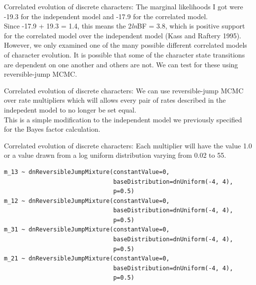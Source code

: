 \documentclass[mathserif]{beamer}
\begin{document}
\begin{frame}[fragile]
    \begin{block}{Correlated evolution of discrete characters:}
    \bigskip
The marginal likelihoods I got were -19.3 for the independent model
and -17.9 for the correlated model.\\
    \bigskip
        Since -17.9 + 19.3 = 1.4, this means the 2\textit{ln}BF = 3.8, which is positive support for
        the correlated model over the independent model (Kass and Raftery 1995).\\
    \bigskip
        However, we only examined one of the many possible different correlated models
        of character evolution.
        It is possible that some of the character state transitions
        are dependent on one another and others are not. We can test for these using
        reversible-jump MCMC.\\
    \end{block}
\end{frame}

\begin{frame}[fragile]
    \begin{block}{Correlated evolution of discrete characters:}
    \bigskip
    \bigskip
    \bigskip
We can use reversible-jump MCMC over rate multipliers which will allows
        every pair of rates described in the indepedent model
        to no longer be set equal.\\
    \bigskip
This is a simple modification to the independent model we previously specified
        for the Bayes factor calculation.
    \end{block}
\end{frame}


\begin{frame}[fragile]
    \begin{block}{Correlated evolution of discrete characters:}
    \bigskip
        Each multiplier will have the
value 1.0 or a value drawn from a log uniform distribution
varying from 0.02 to 55.\\
    \bigskip
    \begin{lstlisting}
m_13 ~ dnReversibleJumpMixture(constantValue=0,
                               baseDistribution=dnUniform(-4, 4),
                               p=0.5)
m_12 ~ dnReversibleJumpMixture(constantValue=0,
                               baseDistribution=dnUniform(-4, 4),
                               p=0.5)
m_31 ~ dnReversibleJumpMixture(constantValue=0,
                               baseDistribution=dnUniform(-4, 4),
                               p=0.5)
m_21 ~ dnReversibleJumpMixture(constantValue=0,
                               baseDistribution=dnUniform(-4, 4),
                               p=0.5)
    \end{lstlisting}
\bigskip
    \end{block}
\end{frame}
\end{document}
